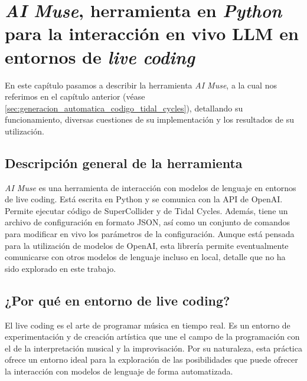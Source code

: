 \chapter{\emph{AI Muse}, herramienta en \emph{Python} para la interacción en vivo LLM en entornos de \emph{live coding}}
\label{chap:ai_muse}


En este capítulo pasamos a describir la herramienta \emph{AI Muse}, a la cual nos referimos en el capítulo anterior (véase \ref{sec:generacion_automatica_codigo_tidal_cycles}), detallando su funcionamiento, diversas cuestiones de su implementación y los resultados de su utilización.

\section{Descripción general de la herramienta}

\emph{AI Muse} es una herramienta de interacción con modelos de lenguaje en entornos de live coding. Está escrita en Python y se comunica con la API de OpenAI. Permite ejecutar código de SuperCollider y de Tidal Cycles. Además, tiene un archivo de configuración en formato JSON, así como un conjunto de comandos para modificar en vivo los parámetros de la configuración. Aunque está pensada para la utilización de modelos de OpenAI, esta librería permite eventualmente comunicarse con otros modelos de lenguaje incluso en local, detalle que no ha sido explorado en este trabajo.


\section{¿Por qué en entorno de live coding?}

El live coding es el arte de programar música en tiempo real. Es un entorno de experimentación y de creación artística que une el campo de la programación con el de la interpretación musical y la improvisación. Por su naturaleza, esta práctica ofrece un entorno ideal para la exploración de las posibilidades que puede ofrecer la interacción con modelos de lenguaje de forma automatizada. 

